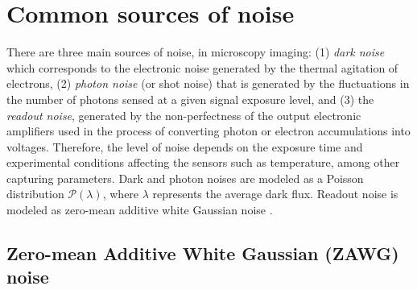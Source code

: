 \documentclass{article}
\begin{document}
\section{Common sources of noise}

There are three main sources of noise, in microscopy imaging: (1)
\emph{dark noise} which corresponds to the electronic noise generated
by the thermal agitation of electrons, (2) \emph{photon noise} (or
shot noise) that is generated by the fluctuations in the number of
photons sensed at a given signal exposure level, and (3) the
\emph{readout noise}, generated by the non-perfectness of the output
electronic amplifiers used in the process of converting photon or
electron accumulations into voltages. Therefore, the level of noise
depends on the exposure time and experimental conditions affecting the
sensors such as temperature, among other capturing parameters. Dark
and photon noises are modeled as a Poisson distribution
$\mathcal{P}(\lambda)$, where $\lambda$ represents the average dark
flux. Readout noise is modeled as zero-mean additive white Gaussian
noise \cite{meiniel2018denoising,zhou2020wirtinger}.

\subsection{Zero-mean Additive White Gaussian (ZAWG) noise}
\end{document}
